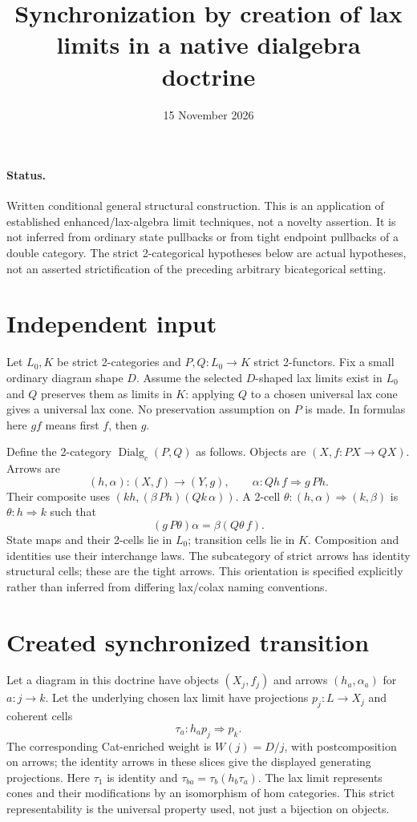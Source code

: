 \documentclass{article}
\title{Synchronization by creation of lax limits in a native dialgebra doctrine}
\date{15 November 2026}
\begin{document}
\maketitle
\paragraph{Status.} Written conditional general structural construction. This is an application of established enhanced/lax-algebra limit techniques, not a novelty assertion. It is not inferred from ordinary state pullbacks or from tight endpoint pullbacks of a double category. The strict 2-categorical hypotheses below are actual hypotheses, not an asserted strictification of the preceding arbitrary bicategorical setting.

\section{Independent input}
Let $L_0,K$ be strict 2-categories and $P,Q:L_0\to K$ strict 2-functors. Fix a small ordinary diagram shape $D$. Assume the selected $D$-shaped lax limits exist in $L_0$ and $Q$ preserves them as limits in $K$: applying $Q$ to a chosen universal lax cone gives a universal lax cone. No preservation assumption on $P$ is made. In formulas here $gf$ means first $f$, then $g$.

Define the 2-category $\operatorname{Dialg}_c(P,Q)$ as follows. Objects are $(X,f:PX\to QX)$. Arrows are
\[
(h,\alpha):(X,f)\to(Y,g),\qquad \alpha:Qh\,f\Rightarrow g\,Ph.
\]
Their composite uses $(kh,(\beta\,Ph)(Qk\,\alpha))$. A 2-cell $\theta:(h,\alpha)\Rightarrow(k,\beta)$ is $\theta:h\Rightarrow k$ such that
\[
(g\,P\theta)\alpha=\beta(Q\theta\,f).
\]
State maps and their 2-cells lie in $L_0$; transition cells lie in $K$. Composition and identities use their interchange laws. The subcategory of strict arrows has identity structural cells; these are the tight arrows. This orientation is specified explicitly rather than inferred from differing lax/colax naming conventions.

\section{Created synchronized transition}
Let a diagram in this doctrine have objects $(X_j,f_j)$ and arrows $(h_a,\alpha_a)$ for $a:j\to k$. Let the underlying chosen lax limit have projections $p_j:L\to X_j$ and coherent cells
\[
\tau_a:h_a p_j\Rightarrow p_k.
\]
The corresponding Cat-enriched weight is $W(j)=D/j$, with postcomposition on arrows; the identity arrows in these slices give the displayed generating projections. Here $\tau_1$ is identity and $\tau_{ba}=\tau_b(h_b\tau_a)$. The lax limit represents cones and their modifications by an isomorphism of hom categories. This strict representability is the universal property used, not just a bijection on objects.
\end{document}
